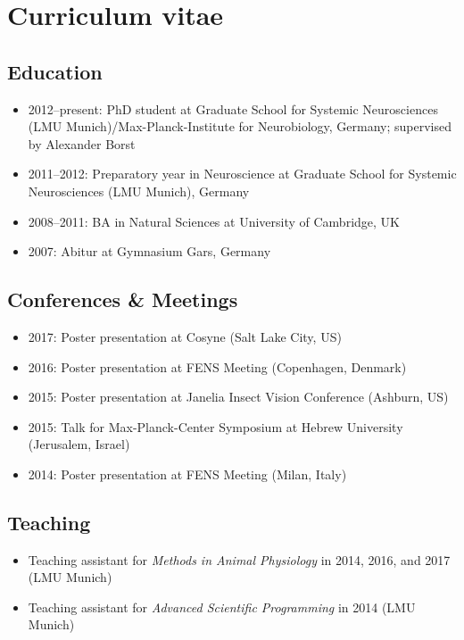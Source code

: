 \chapter*{Curriculum vitae}

\section*{Education}

\begin{itemize}
    \item 2012--present: PhD student at Graduate School for Systemic Neurosciences (LMU Munich)/Max-Planck-Institute for Neurobiology, Germany; supervised by Alexander Borst
    
    \item 2011--2012: Preparatory year in Neuroscience at Graduate School for Systemic Neurosciences (LMU Munich), Germany
    
    \item 2008--2011: BA in Natural Sciences at University of Cambridge, UK
    
    \item 2007: Abitur at Gymnasium Gars, Germany
\end{itemize}

\section*{Conferences \& Meetings}

\begin{itemize}
     \item 2017: Poster presentation at Cosyne (Salt Lake City, US)
     \item 2016: Poster presentation at FENS Meeting (Copenhagen, Denmark)
     \item 2015: Poster presentation at Janelia Insect Vision Conference (Ashburn, US)
     \item 2015: Talk for Max-Planck-Center Symposium at Hebrew University (Jerusalem, Israel)
     \item 2014: Poster presentation at FENS Meeting (Milan, Italy)
\end{itemize}

\section*{Teaching}

\begin{itemize}
     \item Teaching assistant for \textit{Methods in Animal Physiology} in 2014, 2016, and 2017 (LMU Munich)
     \item Teaching assistant for \textit{Advanced Scientific Programming} in 2014 (LMU Munich)
\end{itemize}


